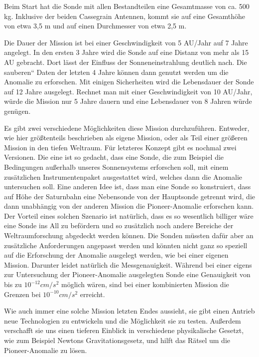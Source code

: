 \bigskip

Beim Start hat die Sonde mit allen Bestandteilen eine Gesamtmasse von
ca. 500 kg. Inklu\-sive der beiden Cassegrain Antennen, kommt sie auf
eine Gesamth\"ohe von etwa 3,5 m und auf einen Durchmesser von etwa 2,5
m.


\bigskip

Die Dauer der Mission ist bei einer Geschwindigkeit von 5 AU/Jahr auf 7
Jahre angelegt. In den ersten 3 Jahre wird die Sonde auf eine Distanz
von mehr als 15 AU gebracht. Dort l\"asst der Einfluss der
Sonneneinstrahlung deutlich nach. Die {\quotedblbase}sauberen`` Daten
der letzten 4 Jahre k\"onnen dann genutzt werden um die Anomalie zu
erforschen. Mit einigen Sicher\-heiten wird die Lebensdauer der Sonde
auf 12 Jahre ausgelegt. Rechnet man mit einer Ge\-schwindigkeit von 10
AU/Jahr, w\"urde die Mission nur 5 Jahre dauern und eine Lebens\-dauer
von 8 Jahren w\"urde gen\"ugen.


\bigskip

Es gibt zwei verschiedene M\"oglichkeiten diese Mission durchzuf\"uhren.
Entweder, wie hier gr\"o{\ss}tenteils beschrieben als eigene Mission,
oder als Teil einer gr\"o{\ss}eren Mission in den tiefen Weltraum.
F\"ur letzteres Konzept gibt es nochmal zwei Versionen. Die eine ist so
ge\-dacht, dass eine Sonde, die zum Beispiel die Bedingungen
au{\ss}erhalb unseres Sonnensys\-tems erforschen soll, mit einem
zus\"atzlichen Instrumentenpaket ausgestattet wird, welches dann die
Anomalie untersuchen soll. Eine anderen Idee ist, dass man eine Sonde
so kon\-struiert, dass auf H\"ohe der Saturnbahn eine Nebensonde von
der Hauptsonde getrennt wird, die dann unabh\"angig von der anderen
Mission die Pioneer-Anomalie erforschen kann. Der Vorteil eines solchen
Szenario ist nat\"urlich, dass es so wesentlich billiger w\"are eine
Sonde ins All zu bef\"ordern und so zus\"atzlich noch andere Bereiche
der Weltraumforschung abgedeckt werden k\"onnen. Die Sonden m\"ussten
daf\"ur aber an zus\"atzliche Anforderungen angepasst werden und
k\"onnten nicht ganz so speziell auf die Erforschung der Anomalie
ausgelegt werden, wie bei einer eigenen Mission. Darunter leidet
nat\"urlich die Messgenauigkeit. W\"ahrend bei einer eigens zur
Untersuchung der Pioneer-Anomalie ausgelegten Sonde eine Genauigkeit
von bis zu  $10^{-12}\mathit{cm}/s^{2}$ m\"oglich w\"aren, sind bei
einer kombinierten Mission die Grenzen bei  $10^{-10}\mathit{cm}/s^{2}$
erreicht.


\bigskip

Wie auch immer eine solche Mission letzten Endes aussieht, sie gibt
einen Antrieb neue Technologien zu entwickeln und die M\"oglichkeit sie
zu testen. Au{\ss}erdem verschafft sie uns einen tieferen Einblick in
verschiedene physikalische Gesetzt, wie zum Beispiel Newtons
Gravitationsgesetz, und hilft das R\"atsel um die Pioneer-Anomalie zu
l\"osen.
